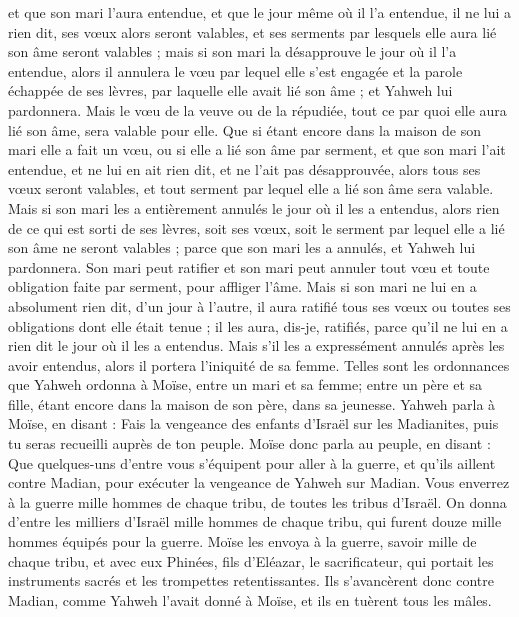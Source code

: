 \begin{multicols}{2}
et que son mari l'aura entendue, et que le jour même où il l'a entendue, il ne lui a rien dit, ses vœux alors seront valables, et ses serments par lesquels elle aura lié son âme seront valables ;
mais si son mari la désapprouve le jour où il l'a entendue, alors il annulera le vœu par lequel elle s'est engagée et la parole échappée de ses lèvres, par laquelle elle avait lié son âme ; et Yahweh lui pardonnera.
Mais le vœu de la veuve ou de la répudiée, tout ce par quoi elle aura lié son âme, sera valable pour elle.
Que si étant encore dans la maison de son mari elle a fait un vœu, ou si elle a lié son âme par serment,
et que son mari l'ait entendue, et ne lui en ait rien dit, et ne l'ait pas désapprouvée, alors tous ses vœux seront valables, et tout serment par lequel elle a lié son âme sera valable.
Mais si son mari les a entièrement annulés le jour où il les a entendus, alors rien de ce qui est sorti de ses lèvres, soit ses vœux, soit le serment par lequel elle a lié son âme ne seront valables ; parce que son mari les a annulés, et Yahweh lui pardonnera.
Son mari peut ratifier et son mari peut annuler tout vœu et toute obligation faite par serment, pour affliger l'âme.
Mais si son mari ne lui en a absolument rien dit, d’un jour à l’autre, il aura ratifié tous ses vœux ou toutes ses obligations dont elle était tenue ; il les aura, dis-je, ratifiés, parce qu'il ne lui en a rien dit le jour où il les a entendus.
Mais s'il les a expressément annulés après les avoir entendus, alors il portera l'iniquité de sa femme.
Telles sont les ordonnances que Yahweh ordonna à Moïse, entre un mari et sa femme; entre un père et sa fille, étant encore dans la maison de son père, dans sa jeunesse.
\VerseOne{}Yahweh parla à Moïse, en disant :
Fais la vengeance des enfants d'Israël sur les Madianites, puis tu seras recueilli auprès de ton peuple.
Moïse donc parla au peuple, en disant : Que quelques-uns d'entre vous s'équipent pour aller à la guerre, et qu'ils aillent contre Madian, pour exécuter la vengeance de Yahweh sur Madian.
Vous enverrez à la guerre mille hommes de chaque tribu, de toutes les tribus d'Israël.
On donna d'entre les milliers d'Israël mille hommes de chaque tribu, qui furent douze mille hommes équipés pour la guerre.
Moïse les envoya à la guerre, savoir mille de chaque tribu, et avec eux Phinées, fils d'Eléazar, le sacrificateur, qui portait les instruments sacrés et les trompettes retentissantes.
Ils s'avancèrent donc contre Madian, comme Yahweh l'avait donné à Moïse, et ils en tuèrent tous les mâles.

\end{multicols}
